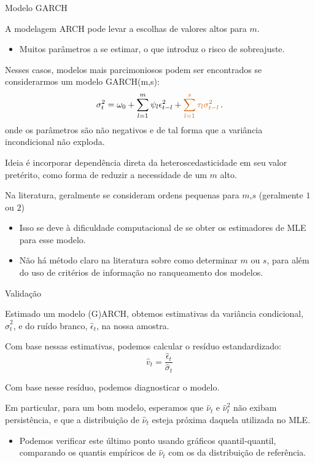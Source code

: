 \documentclass[11pt]{beamer}
\newenvironment{halfwideitemize}{\itemize\addtolength{\itemsep}{0.5em}}{\enditemize}
\begin{document}
\begin{frame}{Modelo GARCH}
\begin{halfwideitemize}
	\item A modelagem ARCH pode levar a escolhas de valores altos para $m$.
	\begin{itemize}
		\item Muitos parâmetros a se estimar, o que introduz o risco de sobreajuste. 
	\end{itemize}
	\item Nesses casos, modelos mais parcimoniosos podem ser encontrados se considerarmos um modelo GARCH(m,s):
$$\sigma^2_t  = \omega_0  +\sum_{l=1}^m \psi_l \epsilon^2_{t-l} + {\color{red}\sum_{l=1}^s \tau_l \sigma^2_{t-l}} \, .$$
onde os parâmetros são não negativos e de tal forma que a variância incondicional não exploda.
\item Ideia é incorporar dependência direta da heteroscedasticidade em seu valor pretérito, como forma de reduzir a necessidade de um $m$ alto.
\item Na literatura, geralmente se consideram ordens pequenas para $m$,$s$ (geralmente $1$ ou $2$)
\begin{itemize}
	\item Isso se deve à dificuldade computacional de se obter os estimadores de MLE para esse modelo.
	\item Não há método claro na literatura sobre como determinar $m$ ou $s$, para além do uso de critérios de informação no ranqueamento dos modelos.
\end{itemize}
\end{halfwideitemize}
\end{frame}

\begin{frame}{Validação}
\begin{halfwideitemize}
	\item Estimado um modelo (G)ARCH, obtemos estimativas da variância condicional, $\hat \sigma^2_t$, e do ruído branco, $\hat \epsilon_t$, na nossa amostra.
	\item Com base nessas estimativas, podemos calcular o resíduo estandardizado:
	$$\hat v_t = \frac{\hat \epsilon_t}{\hat \sigma_t}$$
	\item Com base nesse resíduo, podemos diagnosticar o modelo.
	\item Em particular, para um bom modelo, esperamos que $\hat \nu_t$ e $\hat \nu^2_t$ não exibam persistência, e que a distribuição de $\hat \nu_t$ esteja próxima daquela utilizada no MLE.
	\begin{itemize}
		\item Podemos verificar este último ponto usando gráficos quantil-quantil, comparando os quantis empíricos de $\hat \nu_t$ com os da distribuição de referência.
	\end{itemize}
\end{halfwideitemize}
\end{frame}
\end{document}
